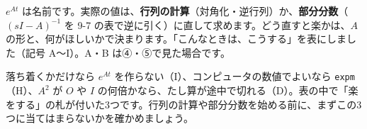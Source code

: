 


\label{bk:9-11:basho}$e^{At}$ は名前です。実際の値は、\textbf{行列の計算}（対角化・逆行列）か、\textbf{部分分数}（$(sI-A)^{-1}$ を 9-7 の表で逆に引く）に直して求めます。どう直すと楽かは、$A$ の形と、何がほしいかで決まります。「こんなときは、こうする」を表にしました（記号 A〜I）。A・B は④・⑤で見た場合です。

落ち着くかだけなら $e^{At}$ を作らない（I）、コンピュータの数値でよいなら \texttt{expm}（H）、$A^2$ が $O$ や $I$ の何倍かなら、たし算が途中で切れる（D）。表の中で「楽をする」の札が付いた3つです。行列の計算や部分分数を始める前に、まずこの3つに当てはまらないかを確かめましょう。

